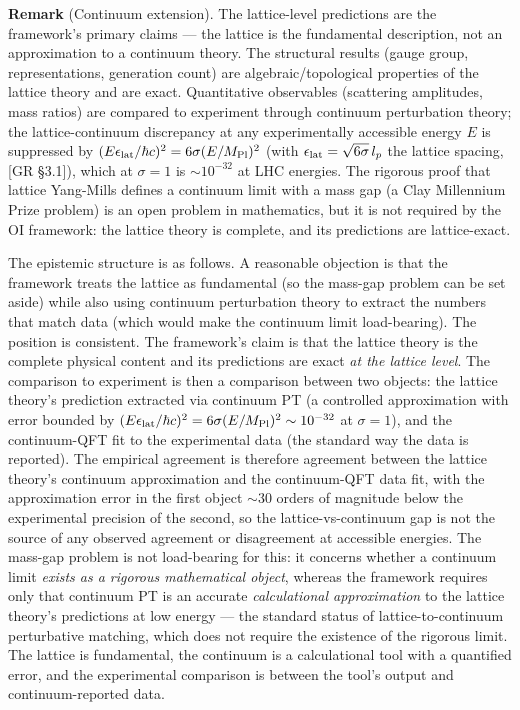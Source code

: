 \documentclass[
]{article}
\begin{document}
\textbf{Remark} (Continuum extension). The lattice-level predictions are
the framework's primary claims --- the lattice is the fundamental
description, not an approximation to a continuum theory. The structural
results (gauge group, representations, generation count) are
algebraic/topological properties of the lattice theory and are exact.
Quantitative observables (scattering amplitudes, mass ratios) are
compared to experiment through continuum perturbation theory; the
lattice-continuum discrepancy at any experimentally accessible energy
\(E\) is suppressed by
\((E\epsilon_{\rm lat}/\hbar c)^2 = 6\sigma(E/M_{\text{Pl}})^2\) (with
\(\epsilon_{\rm lat} = \sqrt{6\sigma}\,l_p\) the lattice spacing, {[}GR
§3.1{]}), which at \(\sigma = 1\) is \(\sim 10^{-32}\) at LHC energies.
The rigorous proof that lattice Yang-Mills defines a continuum limit
with a mass gap (a Clay Millennium Prize problem) is an open problem in
mathematics, but it is not required by the OI framework: the lattice
theory is complete, and its predictions are lattice-exact.

The epistemic structure is as follows. A reasonable objection is that
the framework treats the lattice as fundamental (so the mass-gap problem
can be set aside) while also using continuum perturbation theory to
extract the numbers that match data (which would make the continuum
limit load-bearing). The position is consistent. The framework's claim
is that the lattice theory is the complete physical content and its
predictions are exact \emph{at the lattice level}. The comparison to
experiment is then a comparison between two objects: the lattice
theory's prediction extracted via continuum PT (a controlled
approximation with error bounded by
\((E\epsilon_{\rm lat}/\hbar c)^2 = 6\sigma(E/M_{\text{Pl}})^2 \sim 10^{-32}\)
at \(\sigma = 1\)), and the continuum-QFT fit to the experimental data
(the standard way the data is reported). The empirical agreement is
therefore agreement between the lattice theory's continuum approximation
and the continuum-QFT data fit, with the approximation error in the
first object \(\sim 30\) orders of magnitude below the experimental
precision of the second, so the lattice-vs-continuum gap is not the
source of any observed agreement or disagreement at accessible energies.
The mass-gap problem is not load-bearing for this: it concerns whether a
continuum limit \emph{exists as a rigorous mathematical object}, whereas
the framework requires only that continuum PT is an accurate
\emph{calculational approximation} to the lattice theory's predictions
at low energy --- the standard status of lattice-to-continuum
perturbative matching, which does not require the existence of the
rigorous limit. The lattice is fundamental, the continuum is a
calculational tool with a quantified error, and the experimental
comparison is between the tool's output and continuum-reported data.
\end{document}
